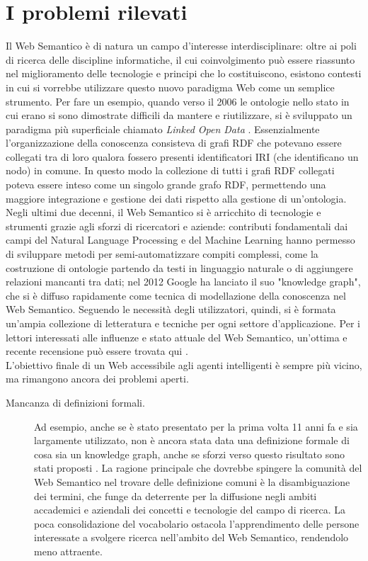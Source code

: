\section[I problemi rilevati]{I problemi rilevati}
Il Web Semantico è di natura un campo d'interesse interdisciplinare: oltre ai poli di ricerca delle discipline informatiche, il cui coinvolgimento può essere riassunto nel miglioramento delle tecnologie e principi che lo costituiscono, esistono contesti in cui si vorrebbe utilizzare questo nuovo paradigma Web come un semplice strumento. Per fare un esempio, quando verso il 2006 le ontologie nello stato in cui erano si sono dimostrate difficili da mantere e riutilizzare, si è sviluppato un paradigma più superficiale chiamato \textit{Linked Open Data} \cite{hitzler2021review}. Essenzialmente l'organizzazione della conoscenza consisteva di grafi RDF che potevano essere collegati tra di loro qualora fossero presenti identificatori IRI (che identificano un nodo) in comune. In questo modo la collezione di tutti i grafi RDF collegati poteva essere inteso come un singolo grande grafo RDF, permettendo una maggiore integrazione e gestione dei dati rispetto alla gestione di un'ontologia.\\
Negli ultimi due decenni, il Web Semantico si è arricchito di tecnologie e strumenti grazie agli sforzi di ricercatori e aziende: contributi fondamentali dai campi del Natural Language Processing e del Machine Learning hanno permesso di sviluppare metodi per semi-automatizzare compiti complessi, come la costruzione di ontologie partendo da testi in linguaggio naturale o di aggiungere relazioni mancanti tra dati; nel 2012 Google ha lanciato il suo "knowledge graph", che si è diffuso rapidamente come tecnica di modellazione della conoscenza nel Web Semantico. Seguendo le necessità degli utilizzatori, quindi, si è formata un'ampia collezione di letteratura e tecniche per ogni settore d'applicazione. Per i lettori interessati alle influenze e stato attuale del Web Semantico, un'ottima e recente recensione può essere trovata qui \cite{hitzler2021review}.\\
L'obiettivo finale di un Web accessibile agli agenti intelligenti è sempre più vicino, ma rimangono ancora dei problemi aperti.
\begin{description}
	\item[Mancanza di definizioni formali.] Ad esempio, anche se è stato presentato per la prima volta 11 anni fa e sia largamente utilizzato, non è ancora stata data una definizione formale di cosa sia un knowledge graph, anche se sforzi verso questo risultato sono stati proposti \cite{ehrlinger2016towards}. La ragione principale che dovrebbe spingere la comunità del Web Semantico nel trovare delle definizione comuni è la disambiguazione dei termini, che funge da deterrente per la diffusione negli ambiti accademici e aziendali dei concetti e tecnologie del campo di ricerca. La poca consolidazione del vocabolario ostacola l'apprendimento delle persone interessate a svolgere ricerca nell'ambito del Web Semantico, rendendolo meno attraente.
\end{description}


